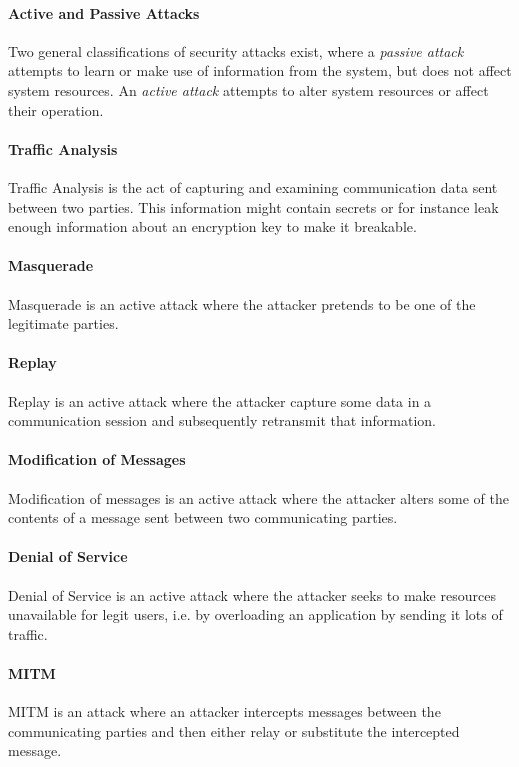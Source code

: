 \documentclass[pdftex,english,10pt,b5paper,twoside]{book}
\begin{document}
\paragraph{Active and Passive Attacks} Two general classifications of security
attacks exist, where a \emph{passive attack} attempts to learn or make use of
information from the system, but does not affect system resources. An
\emph{active attack} attempts to alter system resources or affect their
operation.

\paragraph{Traffic Analysis} Traffic Analysis is the act of capturing and
examining communication data sent between two parties. This information might
contain secrets or for instance leak enough information about an encryption key
to make it breakable.

\paragraph{Masquerade} Masquerade is an active attack where the attacker pretends to be
one of the legitimate parties.

\paragraph{Replay} Replay is an active attack where the attacker capture some
data in a communication session and subsequently retransmit that information.

\paragraph{Modification of Messages} Modification of messages is an active
attack where the attacker alters some of the contents of a message sent between
two communicating parties.

\paragraph{Denial of Service} Denial of Service is an active attack where the
attacker seeks to make resources unavailable for legit users, i.e. by
overloading an application by sending it lots of traffic.

\paragraph{\acl{MITM}} \ac{MITM} is an attack where an attacker intercepts messages
between the communicating parties and then either relay or substitute the
intercepted message.
\end{document}
